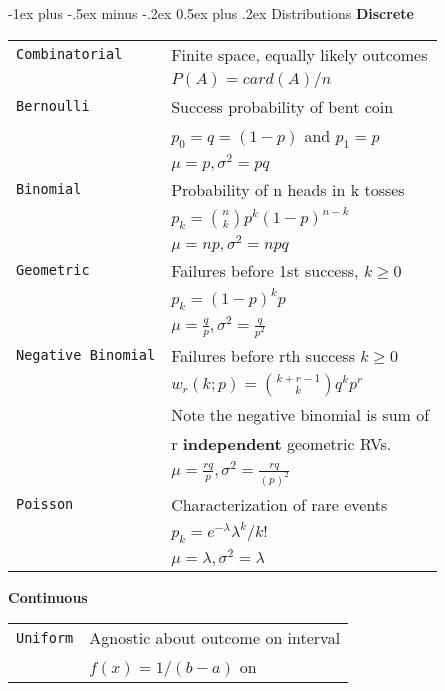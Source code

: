\documentclass[10pt,landscape]{article}
\makeatletter
\renewcommand{\section}{\@startsection{section}{1}{0mm}%
                                {-1ex plus -.5ex minus -.2ex}%
                                {0.5ex plus .2ex}%
                                {\normalfont\large\bfseries}}
\makeatother
\begin{document}
\raggedright
\footnotesize
\begin{multicols*}{3}


\setlength{\premulticols}{1pt}
\setlength{\postmulticols}{1pt}
\setlength{\multicolsep}{1pt}
\setlength{\columnsep}{2pt}
\section{Distributions}
\textbf{Discrete}
\begin{tabular}{@{}ll@{}}
\verb!Combinatorial! & Finite space, equally likely outcomes\\
\verb!! & $P(A)=card(A)/n$\\
\verb!Bernoulli! & Success probability of bent coin\\
\verb!!  & $p_0=q=(1-p)$ and $p_1=p$ \\
\verb!!  &$\mu=p, \sigma^2=pq$ \\
\verb!Binomial!& Probability of n heads in k tosses\\ 
\verb!! & $p_k={n \choose k} p^k(1-p)^{n-k}$\\
\verb!! &$\mu=np, \sigma^2=npq$\\
\verb!Geometric!  & Failures before 1st success, $k\geq 0$\\
\verb!! & $p_k= (1-p)^k p$ \\
\verb!! &$\mu=\frac{q}{p}, \sigma^2=\frac{q}{p^2}$\\
\verb!Negative Binomial!  & Failures before rth success $k\geq 0$\\
\verb!! & $w_r(k;p)={k+r-1 \choose k}q^kp^r$\\
\verb!! & Note the negative binomial is sum of\\ 
\verb!! & r \textbf{independent} geometric RVs.\\
\verb!! &$\mu=\frac{rq}{p}, \sigma^2=\frac{rq}{(p)^2}$\\
\verb!Poisson! & Characterization of rare events\\ 
\verb!! & $p_k = e^{-\lambda} \lambda^k / k! $\\
\verb!! &$\mu=\lambda, \sigma^2=\lambda$\\
\end{tabular}
\textbf{Continuous\\}
\begin{tabular}{@{}ll@{}}
	\verb!Uniform!& Agnostic about outcome on interval \\
	\verb!! & $f(x)=1/(b-a)$ on \\

\end{tabular}
\end{multicols*}
\end{document}
